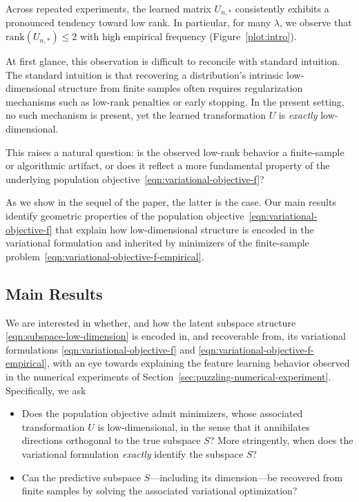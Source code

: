 \documentclass[sn-mathphys-num]{sn-jnl}%
\numberwithin{equation}{section}
\theoremstyle{thmstyleone}%
\theoremstyle{thmstyletwo}%
\theoremstyle{thmstylethree}%
\begin{document}
Across repeated experiments, the learned matrix $U_{n, *}$
consistently exhibits a pronounced tendency toward low rank. In particular, for
many $\lambda$, we observe that $\mathrm{rank}(U_{n, *})
\leq 2$ with high empirical frequency (Figure~\ref{plot:intro}).

At first glance, this observation is difficult to reconcile with standard
intuition. The standard intuition is 
that recovering a distribution's intrinsic low-dimensional structure from 
finite samples often requires regularization mechanisms such 
as low-rank penalties or early stopping. In the present setting,
no such mechanism is present, yet the learned transformation $U$ is \emph{exactly} low-dimensional.


This raises a natural question: is the observed low-rank behavior a finite-sample or algorithmic artifact, or does it reflect a more fundamental property of the underlying population objective~\eqref{eqn:variational-objective-f}?

As we show in the sequel of the paper, the latter is the case. Our main results identify geometric properties 
of the population objective~\eqref{eqn:variational-objective-f} that explain how low-dimensional 
structure is encoded in the variational formulation and inherited by minimizers of the finite-sample 
problem~\eqref{eqn:variational-objective-f-empirical}.




\subsection{Main Results} 
\indent\indent
We are interested in whether, and how the latent subspace structure
\eqref{eqn:subspace-low-dimension} is encoded in, and recoverable from, its variational
formulations \eqref{eqn:variational-objective-f} and
\eqref{eqn:variational-objective-f-empirical}, with an eye towards explaining the feature learning behavior observed in the numerical experiments of Section~\ref{sec:puzzling-numerical-experiment}. Specifically, we ask 

\vspace{.5em} 
\begin{itemize}
\item[($\mathsf{P1}$)] Does the population objective admit minimizers, whose associated
  transformation $U$ is low-dimensional, in the sense that it
 annihilates directions orthogonal to the true subspace $S$? More stringently, when 
  does the variational formulation \emph{exactly} identify the subspace $S$? 
\vspace{.2em} 
\item[($\mathsf{P2}$)] Can the predictive subspace $S$---including its dimension---be recovered from
finite samples by solving the associated variational optimization?
\end{itemize} 
\end{document}
